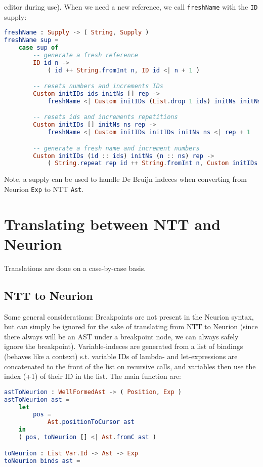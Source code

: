 \documentclass[10pt,a4paper,english]{article}
\begin{document}
editor during use). When we need a new reference, we call \texttt{freshName} with the \texttt{ID} supply:
\begin{lstlisting}[language=elm,%
                     label="eval-evaluated",%
                     gobble=0,%
                     ]
freshName : Supply -> ( String, Supply )
freshName sup =
    case sup of
        -- generate a fresh reference
        ID id n ->
            ( id ++ String.fromInt n, ID id <| n + 1 )

        -- resets numbers and increments IDs
        Custom initIDs ids initNs [] rep ->
            freshName <| Custom initIDs (List.drop 1 ids) initNs initNs rep

        -- resets ids and increments repetitions
        Custom initIDs [] initNs ns rep ->
            freshName <| Custom initIDs initIDs initNs ns <| rep + 1

        -- generate a fresh name and increment numbers
        Custom initIDs (id :: ids) initNs (n :: ns) rep ->
            ( String.repeat rep id ++ String.fromInt n, Custom initIDs (id :: ids) initNs ns rep )
\end{lstlisting}

Note, a supply can be used to handle De Bruijn indeces when converting from Neurion \texttt{Exp} to NTT \texttt{Ast}.


\newpage

\section{Translating between NTT and Neurion}
Translations are done on a case-by-case basis.
\subsection{NTT to Neurion}
Some general considerations: Breakpoints are not present in the Neurion syntax, but can simply be ignored for the sake of translating from NTT to Neurion (since there always will be an AST under a breakpoint node, we can always safely ignore the breakpoint). Variable-indeces are generated from a list of bindings (behaves like a context) s.t. variable IDs of lambda- and let-expressions are concatenated to the front of the list on recursive calls, and variables then use the index (+1) of their ID in the list. The main function are:
\begin{lstlisting}[language=elm,%
                     label="eval-evaluated",%
                     gobble=0,%
                     ]
astToNeurion : WellFormedAst -> ( Position, Exp )
astToNeurion ast =
    let
        pos =
            Ast.positionToCursor ast
    in
    ( pos, toNeurion [] <| Ast.fromC ast )

toNeurion : List Var.Id -> Ast -> Exp
toNeurion binds ast =
\end{lstlisting}
\end{document}
